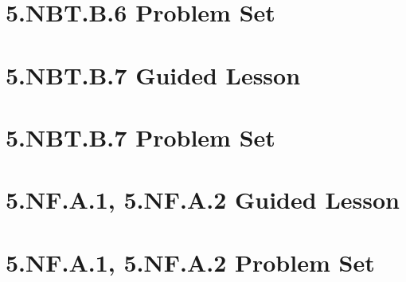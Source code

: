 \documentclass[a4paper,12pt]{article}
\begin{document}
\newpage
\section{5.NBT.B.6 Problem Set}


\newpage
\section{5.NBT.B.7 Guided Lesson}


\newpage
\section{5.NBT.B.7 Problem Set}


\newpage
\section{5.NF.A.1, 5.NF.A.2 Guided Lesson}


\newpage
\section{5.NF.A.1, 5.NF.A.2 Problem Set}

\end{document}
